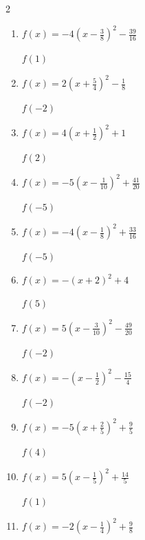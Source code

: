 \begin{multicols}{2}
\begin{enumerate}
$f(-1)$
        \phantom{$=-4$}

  \item $\displaystyle f(x)=-4\left( x-\frac{3}{8}\right)^{2}-\frac{39}{16}$

$f(1)$
        \phantom{$=-4$}

\columnbreak %

\resetques

  \item $\displaystyle f(x)=2\left( x+\frac{5}{4}\right)^{2}-\frac{1}{8}$

$f(-2)$
        \phantom{$=1$}

  \item $\displaystyle f(x)=4\left( x+\frac{1}{2}\right)^{2}+1$

$f(2)$
        \phantom{$=26$}

  \item $\displaystyle f(x)=-5\left( x-\frac{1}{10}\right)^{2}+\frac{41}{20}$

$f(-5)$
        \phantom{$=-128$}

  \item $\displaystyle f(x)=-4\left( x-\frac{1}{8}\right)^{2}+\frac{33}{16}$

$f(-5)$
        \phantom{$=-103$}

  \item $\displaystyle f(x)=-\left( x+2\right)^{2}+4$

$f(5)$
        \phantom{$=-45$}

\columnbreak %

  \item $\displaystyle f(x)=5\left( x-\frac{3}{10}\right)^{2}-\frac{49}{20}$

$f(-2)$
        \phantom{$=24$}

  \item $\displaystyle f(x)=-\left( x-\frac{1}{2}\right)^{2}-\frac{15}{4}$

$f(-2)$
        \phantom{$=-10$}

  \item $\displaystyle f(x)=-5\left( x+\frac{2}{5}\right)^{2}+\frac{9}{5}$

$f(4)$
        \phantom{$=-95$}

  \item $\displaystyle f(x)=5\left( x-\frac{1}{5}\right)^{2}+\frac{14}{5}$

$f(1)$
        \phantom{$=6$}

  \item $\displaystyle f(x)=-2\left( x-\frac{1}{4}\right)^{2}+\frac{9}{8}$


\end{enumerate}
\end{multicols}
